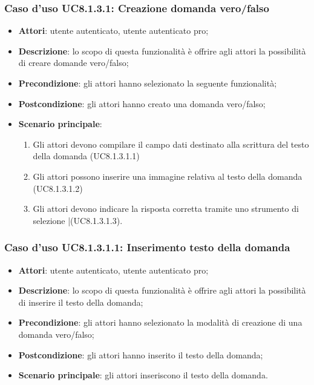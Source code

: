 \subsubsection{Caso d'uso UC8.1.3.1: Creazione domanda vero/falso}
	\begin{itemize}
		\item
			\textbf{Attori}: utente autenticato, utente autenticato pro;
		\item		
			\textbf{Descrizione}: lo scopo di questa funzionalità è offrire agli attori la possibilità di creare domande vero/falso;
		\item
			\textbf{Precondizione}: gli attori hanno selezionato la seguente funzionalità; 
		\item
			\textbf{Postcondizione}: gli attori hanno creato una domanda vero/falso;
		\item
			\textbf{Scenario principale}:
	       		\begin{enumerate}
	       			\item
	       			Gli attori devono compilare il campo dati destinato alla scrittura del testo della domanda (UC8.1.3.1.1)
	       			\item
	       			Gli attori possono inserire una immagine relativa al testo della domanda (UC8.1.3.1.2)
					\item
					Gli attori devono indicare la risposta corretta tramite uno strumento di selezione |(UC8.1.3.1.3).
	 			\end{enumerate}
	\end{itemize}

\subsubsection{Caso d'uso UC8.1.3.1.1: Inserimento testo della domanda}
	\begin{itemize}
		\item
			\textbf{Attori}: utente autenticato, utente autenticato pro;
		\item		
			\textbf{Descrizione}: lo scopo di questa funzionalità è offrire agli attori la possibilità di inserire il testo della domanda;
		\item
			\textbf{Precondizione}: gli attori hanno selezionato la modalità di creazione di una domanda vero/falso; 
		\item
			\textbf{Postcondizione}: gli attori hanno inserito il testo della domanda;
		\item
			\textbf{Scenario principale}: gli attori inseriscono il testo della domanda. 
	 			
	\end{itemize}
	
